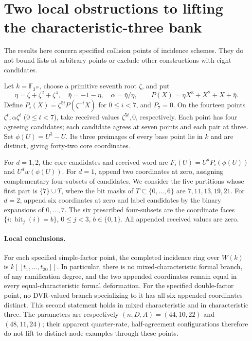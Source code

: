 \section{Two local obstructions to lifting the characteristic-three bank}
\label{sec:charthree-local}
The results here concern specified collision points of incidence schemes.
They do not bound lists at arbitrary points or exclude other constructions
with eight candidates.

Let $k=\mathbb F_{3^{18}}$, choose a primitive seventh root $\zeta$, and put
\[
 \eta=\zeta+\zeta^2+\zeta^4,\quad
 \bar\eta=-1-\eta,\quad \alpha=\bar\eta/\eta,\qquad
 P(X)=\eta X^3+X^2+X+\bar\eta.
\]
Define $P_i(X)=\zeta^{5i}P(\zeta^{-i}X)$ for $0\le i<7$,
and $P_7=0$. On the fourteen points
$\zeta^t,\alpha\zeta^t$ ($0\le t<7$), take received values
$\zeta^{5t},0$, respectively. Each point has four agreeing candidates;
each candidate agrees at seven points and each pair at three.
Set $\phi(U)=U^3-U$. Its three preimages of every base point lie in $k$
and are distinct, giving forty-two core coordinates.

For $d=1,2$, the core candidates and received word are
$F_i(U)=U^dP_i(\phi(U))$ and $U^dw(\phi(U))$.
For $d=1$, append two coordinates at zero, assigning complementary
four-subsets of candidates. We consider the five partitions whose first
part is $\{7\}\cup T$, where the bit masks of $T\subseteq\{0,\ldots,6\}$
are $7,11,13,19,21$. For $d=2$, append six coordinates at zero and label
candidates by the binary expansions of $0,\ldots,7$. The six prescribed
four-subsets are the coordinate faces
$\{i:\operatorname{bit}_j(i)=b\}$, $0\le j<3$, $b\in\{0,1\}$.
All appended received values are zero.

\paragraph{Local conclusions.}
For each specified simple-factor point, the completed incidence ring over
$W(k)$ is $k[[t_1,\ldots,t_{20}]]$. In particular, there is no
mixed-characteristic formal branch, of any ramification degree, and the two
appended coordinates remain equal in every equal-characteristic formal
deformation. For the specified double-factor point, no DVR-valued branch
specializing to it has all six appended coordinates distinct. This second
statement holds in mixed characteristic and in characteristic three.
The parameters are respectively $(n,D,A)=(44,10,22)$ and $(48,11,24)$;
their apparent quarter-rate, half-agreement configurations therefore do
not lift to distinct-node examples through these points.

